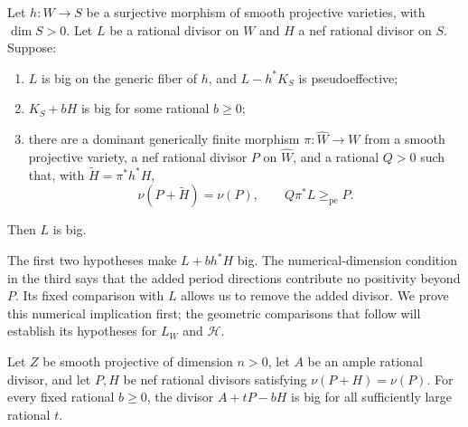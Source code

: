 \begin{proposition}\label{prop:twist-removal}
Let $h:W\to S$ be a surjective morphism of smooth projective
varieties, with $\dim S>0$. Let $L$ be a rational divisor on $W$
and $H$ a nef rational divisor on $S$. Suppose:
\begin{enumerate}
\item $L$ is big on the generic fiber of $h$, and
      $L-h^*K_S$ is pseudoeffective;
\item $K_S+bH$ is big for some rational $b\geq0$;
\item there are a dominant generically finite morphism
      $\pi:\widehat W\to W$ from a smooth projective variety,
      a nef rational divisor $P$ on $\widehat W$, and a rational
      $Q>0$ such that, with $\widetilde H=\pi^*h^*H$,
      \[
      \nu(P+\widetilde H)=\nu(P),\qquad Q\pi^*L\ge_{\mathrm{pe}} P.
      \]
\end{enumerate}
Then $L$ is big.
\end{proposition}

The first two hypotheses make $L+b h^*H$ big. The numerical-dimension
condition in the third says that the added period directions contribute
no positivity beyond $P$. Its fixed comparison with $L$ allows us to
remove the added divisor. We prove this numerical implication first;
the geometric comparisons that follow will establish its hypotheses
for $L_W$ and $\mathcal H$.

\begin{lemma}\label{lem:nef-morse}
Let $Z$ be smooth projective of dimension $n>0$, let $A$ be an ample
rational divisor, and let $P,H$ be nef rational divisors satisfying
$\nu(P+H)=\nu(P)$.  For every fixed rational $b\ge0$, the divisor
$A+tP-bH$ is big for all sufficiently large rational $t$.
\end{lemma}

